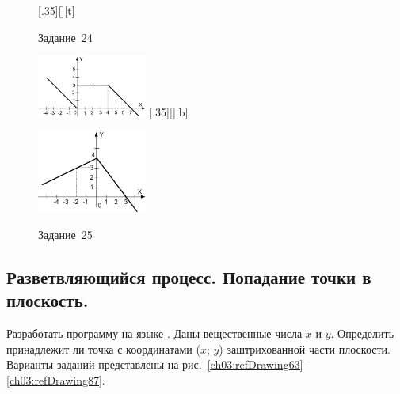 \begin{figure}[h]
\begin{floatrow}
[.35\textwidth][\FBheight][t]
{\caption{Задание~24}
\label{ch03:refDrawing61}}
{\includegraphics[width=0.32\textwidth,keepaspectratio]{img/ris_3_62}}%
%
[.35\textwidth][\FBheight][b]
{\caption{Задание~25}
\label{ch03:refDrawing62}}
{\includegraphics[width=0.32\textwidth]{img/ris_3_63}}
\end{floatrow}
\end{figure}

\subsection[Разветвляющийся процесс. Попадание точки в плоскость.]{Разветвляющийся процесс. Попадание точки в
плоскость.}
Разработать программу на языке . Даны вещественные числа $x$ и $y$. Определить
принадлежит ли точка с координатами ($x$; $y$) заштрихованной части плоскости.
Варианты заданий представлены на рис.~\ref{ch03:refDrawing63}--\ref{ch03:refDrawing87}.


